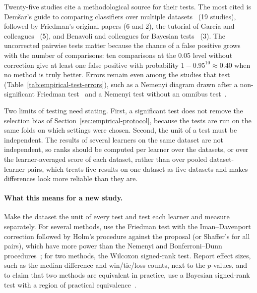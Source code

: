 

Twenty-five studies cite a methodological source for their tests. The most cited is Demšar's guide to comparing classifiers over multiple datasets~\parencite{demsar2006statistical} (19 studies), followed by Friedman's original papers (6 and 2), the tutorial of García and colleagues~\parencite{garcia2010advanced} (5), and Benavoli and colleagues for Bayesian tests~\parencite{benavoli2017time} (3). The uncorrected pairwise tests matter because the chance of a false positive grows with the number of comparisons: ten comparisons at the 0.05 level without correction give at least one false positive with probability $1 - 0.95^{10} \approx 0.40$ when no method is truly better. Errors remain even among the studies that test (Table~\ref{tab:empirical-test-errors}), such as a Nemenyi diagram drawn after a non-significant Friedman test~\parencite{janicka2019soup} and a Nemenyi test without an omnibus test~\parencite{ma2024mcmbrc}.



Two limits of testing need stating. First, a significant test does not remove the selection bias of Section~\ref{sec:empirical-protocol}, because the tests are run on the same folds on which settings were chosen. Second, the unit of a test must be independent. The results of several learners on the same dataset are not independent, so ranks should be computed per learner over the datasets, or over the learner-averaged score of each dataset, rather than over pooled dataset-learner pairs, which treats five results on one dataset as five datasets and makes differences look more reliable than they are.

\paragraph{What this means for a new study.} Make the dataset the unit of every test and test each learner and measure separately. For several methods, use the Friedman test with the Iman--Davenport correction followed by Holm's procedure against the proposal (or Shaffer's for all pairs), which have more power than the Nemenyi and Bonferroni--Dunn procedures~\parencite{demsar2006statistical,garcia2008extension}; for two methods, the Wilcoxon signed-rank test. Report effect sizes, such as the median difference and win/tie/loss counts, next to the $p$-values, and to claim that two methods are equivalent in practice, use a Bayesian signed-rank test with a region of practical equivalence~\parencite{benavoli2017time}.

